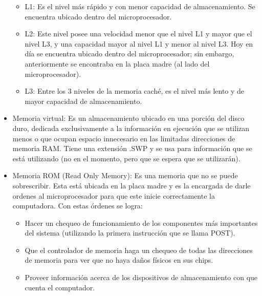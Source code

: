 \documentclass{article}
\begin{document}
\begin{itemize}
    \begin{itemize}
    
        \item L1:
        Es el nivel más rápido y con menor capacidad de almacenamiento. Se encuentra ubicado dentro del microprocesador.
        
        \item L2: 
        Este nivel posee una velocidad menor que el nivel L1 y mayor que el nivel L3, y una capacidad mayor al nivel L1 y menor al nivel L3. Hoy en día se encuentra ubicado dentro del microprocesador; sin embargo, anteriormente se encontraba en la placa madre (al lado del microprocesador).
        
        \item L3:
        Entre los 3 niveles de la memoria caché, es el nivel más lento y de mayor capacidad de almacenamiento.
        
    \end{itemize}
    
    \item Memoria virtual:
    Es un almacenamiento ubicado en una porción del disco duro, dedicada exclusivamente a la información en ejecución que se utilizan menos o que ocupan espacio innecesario en las limitadas direcciones de memoria RAM.
    Tiene una extensión .SWP y se usa para información que se está utilizando (no en el momento, pero que se espera que se utilizarán).

    \item Memoria ROM (Read Only Memory):
    Es una memoria que no se puede sobrescribir.
    Esta está ubicada en la placa madre y es la encargada de darle ordenes al microprocesador para que este inicie correctamente la computadora.
    Con estas órdenes se logra:
    
        \begin{itemize}
        
        \item
            Hacer un chequeo de funcionamiento de los componentes más importantes del sistema (utilizando la primera instrucción que se llama POST).
            
        \item 
            Que el controlador de memoria haga un chequeo de todas las direcciones de memoria para ver que no haya daños físicos en sus chips.
            
        \item 
            Proveer información acerca de los dispositivos de almacenamiento con que cuenta el computador.
            

\end{itemize}
\end{itemize}
\end{document}
